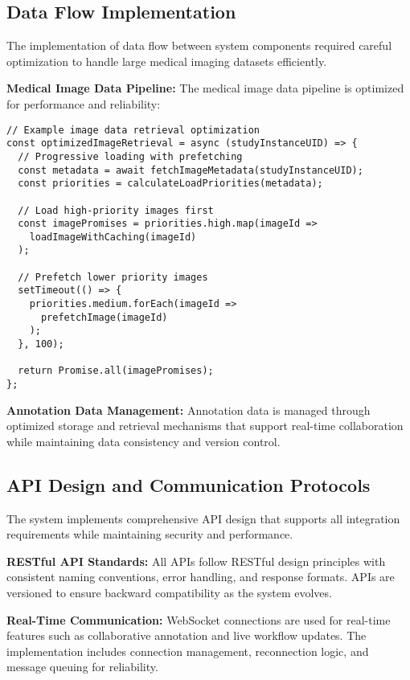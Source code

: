 \subsection{Data Flow Implementation}

The implementation of data flow between system components required careful optimization to handle large medical imaging datasets efficiently.

\textbf{Medical Image Data Pipeline:} The medical image data pipeline is optimized for performance and reliability:

\begin{verbatim}
// Example image data retrieval optimization
const optimizedImageRetrieval = async (studyInstanceUID) => {
  // Progressive loading with prefetching
  const metadata = await fetchImageMetadata(studyInstanceUID);
  const priorities = calculateLoadPriorities(metadata);
  
  // Load high-priority images first
  const imagePromises = priorities.high.map(imageId => 
    loadImageWithCaching(imageId)
  );
  
  // Prefetch lower priority images
  setTimeout(() => {
    priorities.medium.forEach(imageId => 
      prefetchImage(imageId)
    );
  }, 100);
  
  return Promise.all(imagePromises);
};
\end{verbatim}

\textbf{Annotation Data Management:} Annotation data is managed through optimized storage and retrieval mechanisms that support real-time collaboration while maintaining data consistency and version control.

\subsection{API Design and Communication Protocols}

The system implements comprehensive API design that supports all integration requirements while maintaining security and performance.

\textbf{RESTful API Standards:} All APIs follow RESTful design principles with consistent naming conventions, error handling, and response formats. APIs are versioned to ensure backward compatibility as the system evolves.

\textbf{Real-Time Communication:} WebSocket connections are used for real-time features such as collaborative annotation and live workflow updates. The implementation includes connection management, reconnection logic, and message queuing for reliability.

